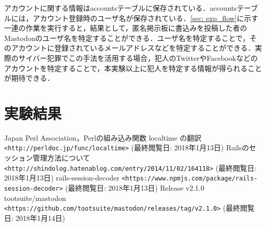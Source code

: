\documentclass[10pt, a4paper]{jreport}
\begin{document}
アカウントに関する情報はaccountsテーブルに保存されている．accountsテーブルには，アカウント登録時のユーザ名が保存されている．\ref{sec: exp_flow}に示す一連の作業を実行すると，結果として，匿名掲示板に書込みを投稿した者のMastodonのユーザ名を特定することができる．ユーザ名を特定することで，そのアカウントに登録されているメールアドレスなどを特定することができる．実際のサイバー犯罪でこの手法を活用する場合，犯人のTwitterやFacebookなどのアカウントを特定することで，本実験以上に犯人を特定する情報が得られることが期待できる．

\section{実験結果}


















\begin{thebibliography}{n}
 Japan Perl Association，Perlの組み込み関数 localtime の翻訳 \verb|<http://perldoc.jp/func/localtime>| (最終閲覧日: 2018年1月13日)
 Railsのセッション管理方法について \verb|<http://shindolog.hatenablog.com/entry/2014/11/02/164118>| (最終閲覧日: 2018年1月13日)
 rails-session-decoder \verb|<https://www.npmjs.com/package/rails-session-decoder>| (最終閲覧日: 2018年1月13日)
 Release v2.1.0  tootsuite/mastodon \verb|<https://github.com/tootsuite/mastodon/releases/tag/v2.1.0>| (最終閲覧日: 2018年1月14日)

\end{thebibliography}

\end{document}
